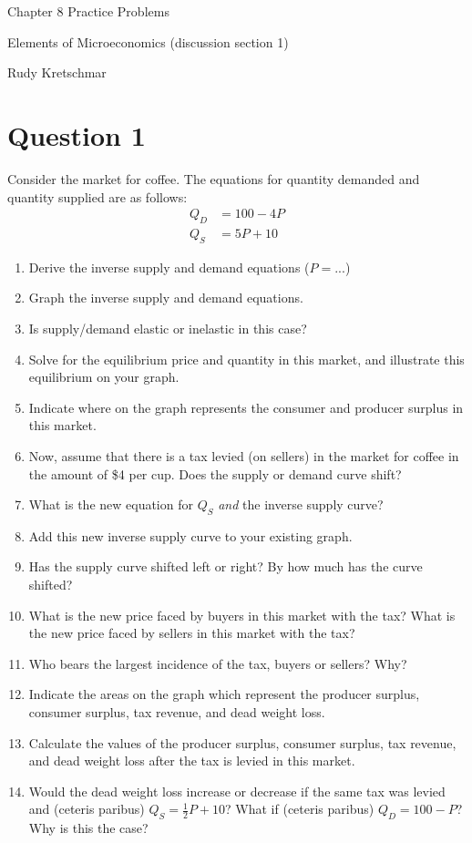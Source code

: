 \documentclass[12pt]{article}
\begin{document}
\begin{center}
\Large Chapter 8 Practice Problems

\medskip

\normalsize Elements of Microeconomics (discussion section 1)

\medskip

\small Rudy Kretschmar
\end{center}

\section*{Question 1}
Consider the market for coffee. The equations for quantity demanded and quantity supplied are as follows:
\begin{align*}
    Q_D &= 100-4P\\
    Q_S &= 5P + 10
\end{align*}
\begin{enumerate}[label=(\alph*)]

    \item Derive the inverse supply and demand equations ($P = ...$)
    \item Graph the inverse supply and demand equations.
    \item Is supply/demand elastic or inelastic in this case?
    \item Solve for the equilibrium price and quantity in this market, and illustrate this equilibrium on your graph.
    \item Indicate where on the graph represents the consumer and producer surplus in this market.
    \item Now, assume that there is a tax levied (on sellers) in the market for coffee in the amount of \$4 per cup. Does the supply or demand curve shift?
    \item What is the new equation for $Q_S$ \textit{and} the inverse supply curve?
    \item Add this new inverse supply curve to your existing graph. 
    \item Has the supply curve shifted left or right? By how much has the curve shifted?
    \item What is the new price faced by buyers in this market with the tax? What is the new price faced by sellers in this market with the tax?
    \item Who bears the largest incidence of the tax, buyers or sellers? Why?
    \item Indicate the areas on the graph which represent the producer surplus, consumer surplus, tax revenue, and dead weight loss.
    \item Calculate the values of the producer surplus, consumer surplus, tax revenue, and dead weight loss after the tax is levied in this market.
    \item Would the dead weight loss increase or decrease if the same tax was levied and (ceteris paribus) $Q_S = \frac{1}{2}P + 10$? What if (ceteris paribus) $Q_D = 100 - P$? Why is this the case? 
\end{enumerate}
\end{document}
